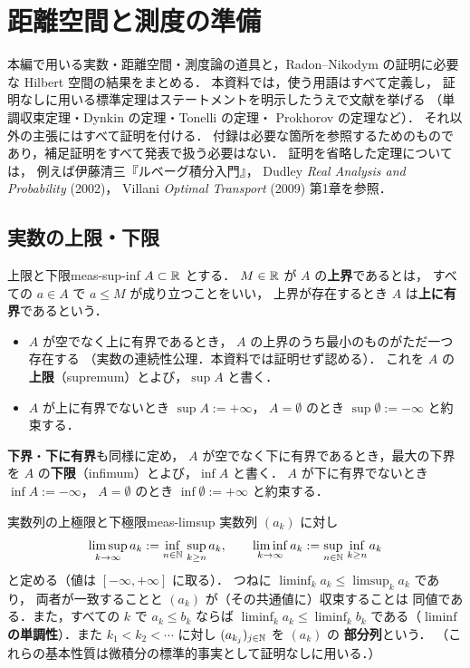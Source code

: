 \chapter{距離空間と測度の準備}
\label{ch:found-preliminaries}

本編で用いる実数・距離空間・測度論の道具と，Radon--Nikodym の証明に必要な Hilbert 空間の結果をまとめる．
本資料では，使う用語はすべて定義し，
証明なしに用いる標準定理はステートメントを明示したうえで文献を挙げる
（単調収束定理・Dynkin の定理・Tonelli の定理・
Prokhorov の定理など）．
それ以外の主張にはすべて証明を付ける．
付録は必要な箇所を参照するためのものであり，補足証明をすべて発表で扱う必要はない．
証明を省略した定理については，
例えば伊藤清三『ルベーグ積分入門』，
Dudley \emph{Real Analysis and Probability} (2002)，
Villani \emph{Optimal Transport} (2009) 第1章を参照．

\section{実数の上限・下限}

\begin{definition}{上限と下限}{meas-sup-inf}
  $A\subset\mathbb{R}$ とする．
  $M\in\mathbb{R}$ が $A$ の\textbf{上界}であるとは，
  すべての $a\in A$ で $a\leq M$ が成り立つことをいい，
  上界が存在するとき $A$ は\textbf{上に有界}であるという．
  \begin{itemize}
    \item $A$ が空でなく上に有界であるとき，
      $A$ の上界のうち最小のものがただ一つ存在する
      （実数の連続性公理．本資料では証明せず認める）．
      これを $A$ の\textbf{上限}（supremum）とよび，$\sup A$ と書く．
    \item $A$ が上に有界でないとき $\sup A:=+\infty$，
      $A=\emptyset$ のとき $\sup\emptyset:=-\infty$ と約束する．
  \end{itemize}
  \textbf{下界}・\textbf{下に有界}も同様に定め，
  $A$ が空でなく下に有界であるとき，最大の下界を
  $A$ の\textbf{下限}（infimum）とよび，$\inf A$ と書く．
  $A$ が下に有界でないとき $\inf A:=-\infty$，
  $A=\emptyset$ のとき $\inf\emptyset:=+\infty$ と約束する．
\end{definition}

\begin{definition}{実数列の上極限と下極限}{meas-limsup}
  実数列 $(a_k)$ に対し
  \[
    \limsup_{k\to\infty}a_k
    :=\inf_{n\in\mathbb{N}}\,\sup_{k\geq n}a_k,
    \qquad
    \liminf_{k\to\infty}a_k
    :=\sup_{n\in\mathbb{N}}\,\inf_{k\geq n}a_k
  \]
  と定める（値は $[-\infty,+\infty]$ に取る）．
  つねに $\liminf_ka_k\leq\limsup_ka_k$ であり，
  両者が一致することと $(a_k)$ が（その共通値に）収束することは
  同値である．また，すべての $k$ で $a_k\leq b_k$ ならば
  $\liminf_ka_k\leq\liminf_kb_k$ である（\textbf{$\liminf$ の単調性}）．また
  $k_1<k_2<\cdots$ に対し $(a_{k_j})_{j\in\mathbb{N}}$ を $(a_k)$ の
  \textbf{部分列}という．
  （これらの基本性質は微積分の標準的事実として証明なしに用いる．）
\end{definition}

